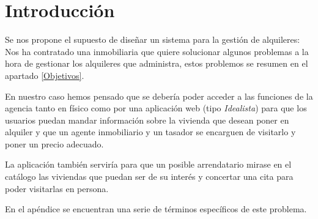 \chapter{Introducción}

Se nos propone el supuesto de diseñar un sistema para la gestión de alquileres: Nos ha contratado una inmobiliaria que quiere solucionar algunos problemas a la hora de gestionar los alquileres que administra, estos problemos se resumen en el apartado \ref{Objetivos}.

En nuestro caso hemos pensado que se debería poder acceder a las funciones de la agencia tanto en físico como por una aplicación web (tipo \textit{Idealista}) para que los usuarios puedan mandar información sobre la vivienda que desean poner en alquiler y que un agente inmobiliario y un tasador se encarguen de visitarlo y poner un precio adecuado. 

La aplicación también serviría para que un posible arrendatario mirase en el catálogo las viviendas que puedan ser de su interés y concertar una cita para poder visitarlas en persona.

En el apéndice se encuentran una serie de términos específicos de este problema.